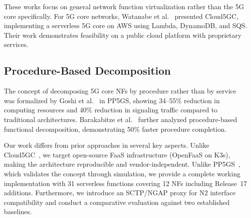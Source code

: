 These works focus on general network function virtualization rather than the 5G core specifically. For 5G core networks, Watanabe et al.~\cite{cloud5gc-2024} presented Cloud5GC, implementing a serverless 5G core on AWS using Lambda, DynamoDB, and SQS. Their work demonstrates feasibility on a public cloud platform with proprietary services.

\subsection{Procedure-Based Decomposition}

The concept of decomposing 5G core NFs by procedure rather than by service was formalized by Goshi et al.~\cite{pp5gs-2023} in PP5GS, showing 34--55\% reduction in computing resources and 40\% reduction in signaling traffic compared to traditional architectures. Barakabitze et al.~\cite{proc-decomp-2022} further analyzed procedure-based functional decomposition, demonstrating 50\% faster procedure completion.

Our work differs from prior approaches in several key aspects. Unlike Cloud5GC~\cite{cloud5gc-2024}, we target open-source FaaS infrastructure (OpenFaaS on K3s), making the architecture reproducible and vendor-independent. Unlike PP5GS~\cite{pp5gs-2023}, which validates the concept through simulation, we provide a complete working implementation with 31 serverless functions covering 12 NFs including Release~17 additions. Furthermore, we introduce an SCTP/NGAP proxy for N2 interface compatibility and conduct a comparative evaluation against two established baselines.

